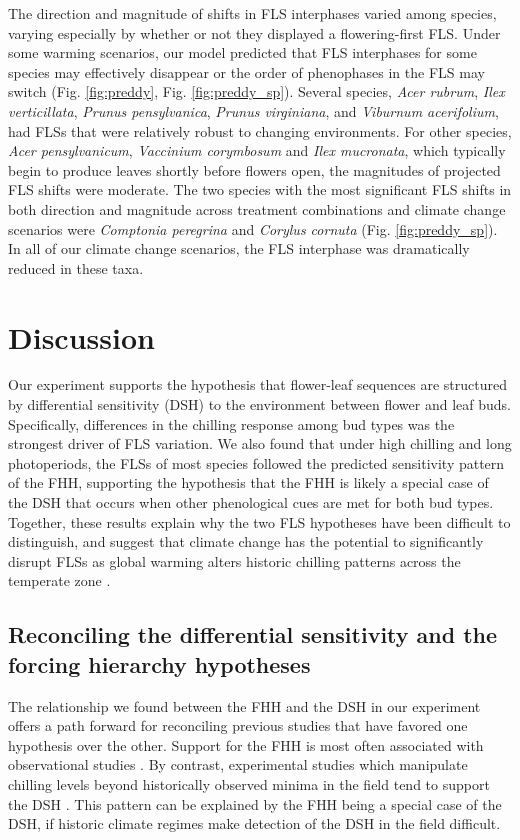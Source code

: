 \documentclass[11pt]{article}\usepackage[]{graphicx}\usepackage[]{color}
\begin{document}
\noindent The direction and magnitude of shifts in FLS interphases varied among species, varying especially by whether or not they displayed a flowering-first FLS. Under some warming scenarios, our model predicted that  FLS interphases for some species may effectively disappear or the order of phenophases in the FLS may switch (Fig. \ref{fig:preddy}, Fig. \ref{fig:preddy_sp}). Several species, \textit{Acer rubrum}, \textit{Ilex verticillata}, \textit{Prunus pensylvanica}, \textit{Prunus virginiana}, and \textit{Viburnum acerifolium}, had FLSs that were relatively robust to changing environments. For other species, \textit{Acer pensylvanicum}, \textit{Vaccinium corymbosum} and \textit{Ilex mucronata}, which typically begin to produce leaves shortly before flowers open, the magnitudes of projected FLS shifts were moderate. The two species with the most significant FLS shifts in both direction and magnitude across treatment combinations and climate change scenarios were \textit{Comptonia peregrina} and \textit{Corylus cornuta} (Fig. \ref{fig:preddy_sp}). In all of our climate change scenarios, the FLS interphase was dramatically reduced in these taxa.\\

\section*{Discussion}
\noindent Our experiment supports the hypothesis that flower-leaf sequences are structured by differential sensitivity (DSH) to the environment between flower and leaf buds. Specifically, differences in the chilling response among bud types was the strongest driver of FLS variation. We also found that under high chilling and long photoperiods, the FLSs of most species followed the predicted sensitivity pattern of the FHH, supporting the hypothesis that the FHH is likely a special case of the DSH that occurs when other phenological cues are met for both bud types. Together, these results explain why the two FLS hypotheses have been difficult to distinguish, and suggest that climate change has the potential to significantly disrupt FLSs as global warming alters historic chilling patterns across the temperate zone \citep{Morin:2009aa}. 

\subsection*{Reconciling the differential sensitivity and the forcing hierarchy hypotheses}
\noindent The relationship we found between the FHH and the DSH in our experiment offers a path forward for reconciling previous studies that have favored one hypothesis over the other. Support for the FHH is most often associated with observational studies \citep[e.g.][]{COSMULESCU:2020aa,Guo2014}. By contrast, experimental studies which manipulate chilling levels beyond historically observed minima in the field tend to support the DSH \citep[e.g.][]{Aslani2009,Gariglio2006}. This pattern can be explained by the FHH being a special case of the DSH, if historic climate regimes make detection of the DSH in the field difficult.\\ %
\end{document}
